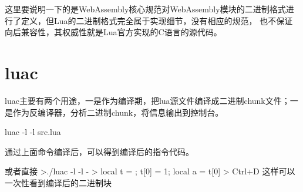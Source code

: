 这里要说明一下的是WebAssembly核心规范对WebAssembly模块的二进制格式进行了定义，但Lua的二进制格式完全属于实现细节，没有相应的规范，
也不保证向后兼容性，其权威性就是Lua官方实现的C语言的源代码。


\section{luac}
luac主要有两个用途，一是作为编译期，把lua源文件编译成二进制chunk文件；一是作为反编译器，分析二进制chunk，将信息输出到控制台。

luac -l -l src.lua

通过上面命令编译后，可以得到编译后的指令代码。

或者直接
>./luac -l -l -
> local t = {}; t[0] = 1; local a = t[0]
> Ctrl+D
这样可以一次性看到编译后的二进制块
